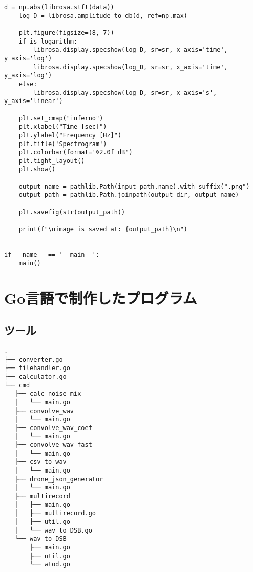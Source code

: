 \begin{lstlisting}[caption=plot\_spectrogram\_librosa.py,label=plot_spectrogram_librosa.py]
    d = np.abs(librosa.stft(data))
    log_D = librosa.amplitude_to_db(d, ref=np.max)

    plt.figure(figsize=(8, 7))
    if is_logarithm:
        librosa.display.specshow(log_D, sr=sr, x_axis='time', y_axis='log')
        librosa.display.specshow(log_D, sr=sr, x_axis='time', y_axis='log')
    else:
        librosa.display.specshow(log_D, sr=sr, x_axis='s', y_axis='linear')

    plt.set_cmap("inferno")
    plt.xlabel("Time [sec]")
    plt.ylabel("Frequency [Hz]")
    plt.title('Spectrogram')
    plt.colorbar(format='%2.0f dB')
    plt.tight_layout()
    plt.show()

    output_name = pathlib.Path(input_path.name).with_suffix(".png")
    output_path = pathlib.Path.joinpath(output_dir, output_name)

    plt.savefig(str(output_path))

    print(f"\nimage is saved at: {output_path}\n")


if __name__ == '__main__':
    main()
\end{lstlisting}


\section{Go言語で制作したプログラム}



\subsection{ツール}

\begin{lstlisting}[caption=ディレクトリ構成,label=ディレクトリ構成]
.
├── converter.go
├── filehandler.go
├── calculator.go
└── cmd
   ├── calc_noise_mix
   │   └── main.go
   ├── convolve_wav
   │   └── main.go
   ├── convolve_wav_coef
   │   └── main.go
   ├── convolve_wav_fast
   │   └── main.go
   ├── csv_to_wav
   │   └── main.go
   ├── drone_json_generator
   │   └── main.go
   ├── multirecord
   │   ├── main.go
   │   ├── multirecord.go
   │   ├── util.go
   │   └── wav_to_DSB.go
   └── wav_to_DSB
       ├── main.go
       ├── util.go
       └── wtod.go
\end{lstlisting}

